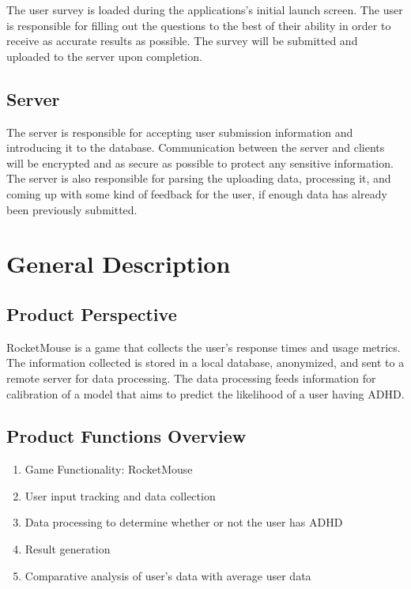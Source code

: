 \documentclass[a4wide]{article}
\begin{document}
The user survey is loaded during the applications's initial launch screen.
The user is responsible for filling out the questions to the best of their ability in order to receive as accurate results as possible.
The survey will be submitted and uploaded to the server upon completion. 

\subsection{Server}

The server is responsible for accepting user submission information and introducing it to the database.
Communication between the server and clients will be encrypted and as secure as possible to protect any sensitive information. The server is also responsible for parsing the uploading data, processing it, and coming up with some kind of feedback for the user, if enough data has already been previously submitted.


\section{General Description}

\subsection{Product Perspective}

RocketMouse is a game that collects the user's response times and usage metrics.
The information collected is stored in a local database, anonymized, and sent to
a remote server for data processing. The data processing feeds information for
calibration of a model that aims to predict the likelihood of a user having ADHD.

\subsection{Product Functions Overview}

\begin{enumerate}
\item Game Functionality: RocketMouse
\item User input tracking and data collection
\item Data processing to determine whether or not the user has ADHD
\item Result generation
\item Comparative analysis of user's data with average user data
\end{enumerate}
\end{document}
